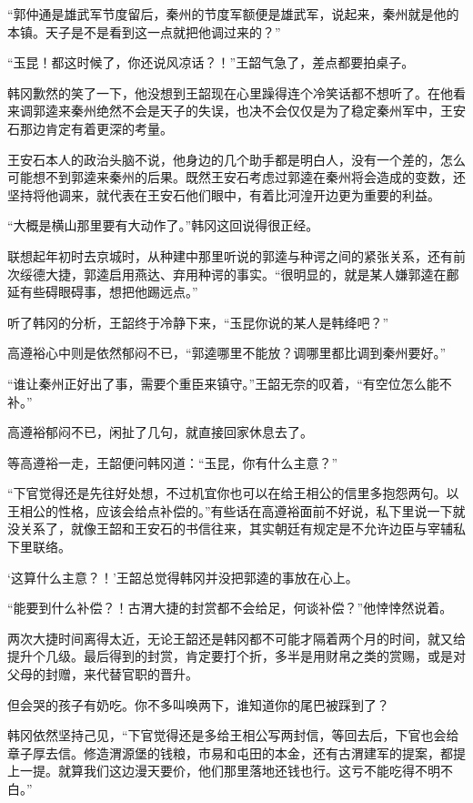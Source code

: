 “郭仲通是雄武军节度留后，秦州的节度军额便是雄武军，说起来，秦州就是他的本镇。天子是不是看到这一点就把他调过来的？”

“玉昆！都这时候了，你还说风凉话？！”王韶气急了，差点都要拍桌子。

韩冈歉然的笑了一下，他没想到王韶现在心里躁得连个冷笑话都不想听了。在他看来调郭逵来秦州绝然不会是天子的失误，也决不会仅仅是为了稳定秦州军中，王安石那边肯定有着更深的考量。

王安石本人的政治头脑不说，他身边的几个助手都是明白人，没有一个差的，怎么可能想不到郭逵来秦州的后果。既然王安石考虑过郭逵在秦州将会造成的变数，还坚持将他调来，就代表在王安石他们眼中，有着比河湟开边更为重要的利益。

“大概是横山那里要有大动作了。”韩冈这回说得很正经。

联想起年初时去京城时，从种建中那里听说的郭逵与种谔之间的紧张关系，还有前次绥德大捷，郭逵启用燕达、弃用种谔的事实。“很明显的，就是某人嫌郭逵在鄜延有些碍眼碍事，想把他踢远点。”

听了韩冈的分析，王韶终于冷静下来，“玉昆你说的某人是韩绛吧？”

高遵裕心中则是依然郁闷不已，“郭逵哪里不能放？调哪里都比调到秦州要好。”

“谁让秦州正好出了事，需要个重臣来镇守。”王韶无奈的叹着，“有空位怎么能不补。”

高遵裕郁闷不已，闲扯了几句，就直接回家休息去了。

等高遵裕一走，王韶便问韩冈道：“玉昆，你有什么主意？”

“下官觉得还是先往好处想，不过机宜你也可以在给王相公的信里多抱怨两句。以王相公的性格，应该会给点补偿的。”有些话在高遵裕面前不好说，私下里说一下就没关系了，就像王韶和王安石的书信往来，其实朝廷有规定是不允许边臣与宰辅私下里联络。

‘这算什么主意？！’王韶总觉得韩冈并没把郭逵的事放在心上。

“能要到什么补偿？！古渭大捷的封赏都不会给足，何谈补偿？”他悻悻然说着。

两次大捷时间离得太近，无论王韶还是韩冈都不可能才隔着两个月的时间，就又给提升个几级。最后得到的封赏，肯定要打个折，多半是用财帛之类的赏赐，或是对父母的封赠，来代替官职的晋升。

但会哭的孩子有奶吃。你不多叫唤两下，谁知道你的尾巴被踩到了？

韩冈依然坚持己见，“下官觉得还是多给王相公写两封信，等回去后，下官也会给章子厚去信。修造渭源堡的钱粮，市易和屯田的本金，还有古渭建军的提案，都提上一提。就算我们这边漫天要价，他们那里落地还钱也行。这亏不能吃得不明不白。”

